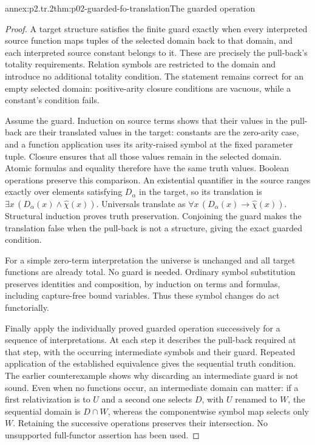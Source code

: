 \begin{annexitem}{annex:p2.tr.2}{thm:p02-guarded-fo-translation}{The guarded operation}
\begin{proof}
A target structure satisfies the finite guard exactly when every
interpreted source function maps tuples of the selected domain back to
that domain, and each interpreted source constant belongs to it. These
are precisely the pull-back's totality requirements. Relation symbols
are restricted to the domain and introduce no additional totality
condition. The statement remains correct for an empty selected domain:
positive-arity closure conditions are vacuous, while a constant's
condition fails.

Assume the guard. Induction on source terms shows that their values in
the pull-back are their translated values in the target: constants are
the zero-arity case, and a function application uses its arity-raised
symbol at the fixed parameter tuple. Closure ensures that all those
values remain in the selected domain. Atomic formulas and equality
therefore have the same truth values. Boolean operations preserve this
comparison. An existential quantifier in the source ranges exactly
over elements satisfying \(D_\alpha\) in the target, so its translation
is \(\exists x\,(D_\alpha(x)\land\widehat\chi(x))\). Universals translate
as \(\forall x\,(D_\alpha(x)\to\widehat\chi(x))\). Structural induction
proves truth preservation. Conjoining the guard makes the translation
false when the pull-back is not a structure, giving the exact guarded
condition.

For a simple zero-term interpretation the universe is unchanged and
all target functions are already total. No guard is needed. Ordinary
symbol substitution preserves identities and composition, by induction
on terms and formulas, including capture-free bound variables. Thus
these symbol changes do act functorially.

Finally apply the individually proved guarded operation successively
for a sequence of interpretations. At each step it describes the
pull-back required at that step, with the occurring intermediate symbols
and their guard. Repeated application of the established equivalence
gives the sequential truth condition. The earlier counterexample shows
why discarding an intermediate guard is not sound. Even when no functions
occur, an intermediate domain can matter: if a first relativization is
to \(U\) and a second one selects \(D\), with \(U\) renamed to \(W\),
the sequential domain is \(D\cap W\), whereas the componentwise
symbol map selects only \(W\). Retaining the successive operations
preserves their intersection. No unsupported full-functor assertion
has been used.
\end{proof}
\end{annexitem}
